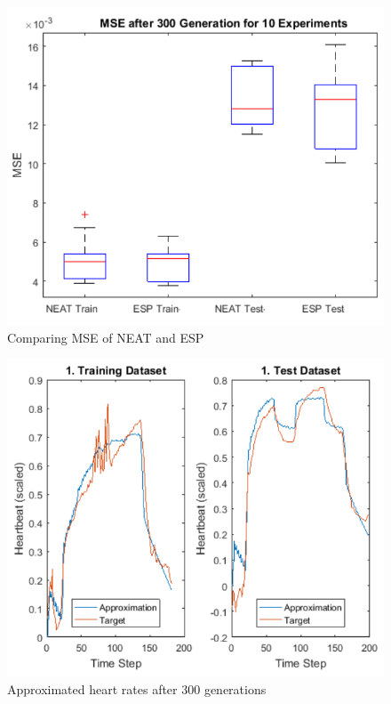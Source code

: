 \documentclass{hbrs-ecta-report}
\begin{document}
\begin{figure}[ht!]
\centering
\includegraphics[width=\linewidth]{img/4.png}
\caption{Comparing MSE of NEAT and ESP}
\label{fig:4} 
\end{figure}

\begin{figure}[ht!]
\centering
\includegraphics[width=\linewidth]{img/5.png}
\caption{Approximated heart rates after 300 generations}
\label{fig:5} 
\end{figure}
\end{document}
